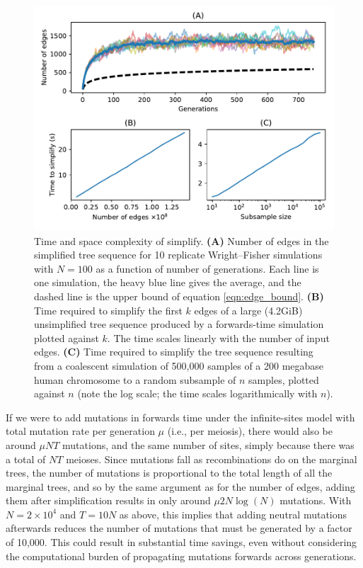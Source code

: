 \documentclass{article}
\begin{document}
\begin{figure}
    \begin{center}
        \includegraphics{sims/simplify-results}
    \end{center}
    \caption{
        Time and space complexity of simplify.
        \textbf{(A)}
        Number of edges in the simplified tree sequence
        for 10 replicate Wright--Fisher simulations with $N=100$ as a function
        of number of generations.
        Each line is one simulation, the heavy blue line gives the average,
        and the dashed line is the upper bound of equation \eqref{eqn:edge_bound}.
        \textbf{(B)}
        Time required to simplify the first $k$ edges of a large (4.2GiB)
        unsimplified tree sequence produced by a forwards-time simulation plotted
        against $k$. The time scales linearly with the number of input edges.
        \textbf{(C)}
        Time required to simplify the tree sequence resulting from a coalescent
        simulation of 500,000 samples of a 200 megabase human chromosome
        to a random subsample of $n$ samples, plotted against $n$
        (note the log scale; the time scales logarithmically with $n$).
        \label{fig:simplify_complexity}
    }
\end{figure}

If we were to add mutations in forwards time
under the infinite-sites model with total mutation rate per generation $\mu$ (i.e., per meiosis),
there would also be around $\mu NT$ mutations, and the same number of sites,
simply because there was a total of $NT$ meioses.
Since mutations fall as recombinations do on the marginal trees,
the number of mutations is proportional to the total length of all the marginal trees,
and so by the same argument as for the number of edges,
adding them after simplification results in only around $\mu 2 N \log(N)$ mutations.
With $N=2 \times 10^4$ and $T=10N$ as above,
this implies that adding neutral mutations afterwards reduces the number of mutations that must be generated
by a factor of 10,000.
This could result in substantial time savings,
even without considering the
computational burden of propagating mutations forwards across generations.
\end{document}
